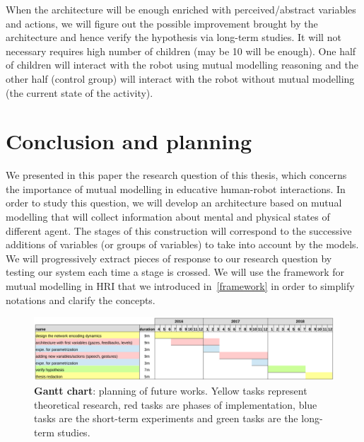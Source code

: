 \documentclass[10pt,a4paper]{article}
\begin{document}
When the architecture will be enough enriched with perceived/abstract variables and actions, we will figure out the possible improvement brought by the architecture and hence verify the hypothesis via long-term studies. It will not necessary requires high number of children (may be 10 will be enough). One half of children will interact with the robot using mutual modelling reasoning and the other half (control group) will interact with the robot without mutual modelling (the current state of the activity). %

\section{Conclusion and planning}

We presented in this paper the research question of this thesis, which concerns the importance of mutual modelling in educative human-robot interactions. In order to study this question, we will develop an architecture based on mutual modelling that will collect information about mental and physical states of different agent. The stages of this construction will correspond to the successive additions of variables (or groups of variables) to take into account by the models. We will progressively extract pieces of response to our research question by testing our system each time a stage is crossed. We will use the framework for mutual modelling in HRI that we introduced in~\ref{framework} in order to simplify notations and clarify the concepts. 


\begin{figure}[h]
\centering
\includegraphics[width=1.\columnwidth]{gantt}
\caption{\small \textbf{Gantt chart}: planning of future works. Yellow tasks represent theoretical research, red tasks are phases of implementation, blue tasks are the short-term experiments and green tasks are the long-term studies.}
\label{gantt}
\end{figure} 



\small
 
\end{document}
